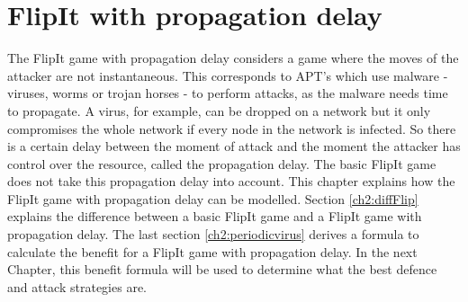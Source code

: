 \chapter{FlipIt with propagation delay}
\label{chapter2:FlipIt with virus propagation}
%


The FlipIt game with propagation delay considers a game where the moves of the attacker are not instantaneous. This corresponds to APT's which use malware - viruses, worms or trojan horses - to perform attacks, as the malware needs time to propagate. A virus, for example, can be dropped on a network but it only compromises the whole network if every node in the network is infected. So there is a certain delay between the moment of attack and the moment the attacker has control over the resource, called the propagation delay. The basic FlipIt game does not take this propagation delay into account. This chapter explains how the FlipIt game with propagation delay can be modelled. Section \ref{ch2:diffFlip} explains the difference between a basic FlipIt game and a FlipIt game with propagation delay. The last section \ref{ch2:periodicvirus} derives a formula to calculate the benefit for a FlipIt game with propagation delay. In the next Chapter, this benefit formula will be used to determine what the best defence and attack strategies are.
%
%
%


